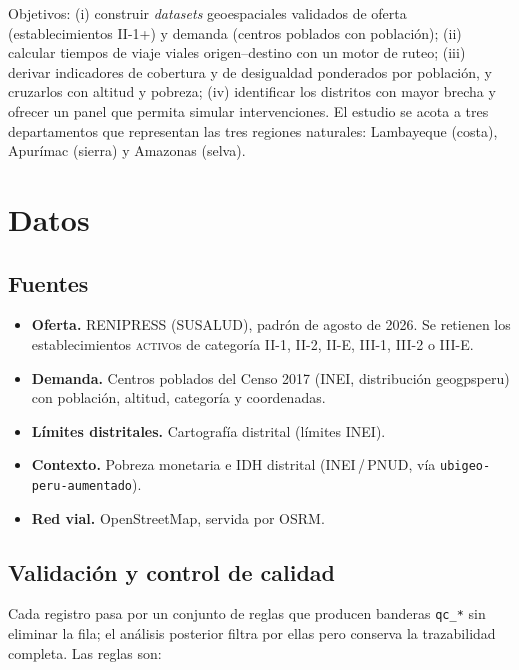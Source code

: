 \documentclass[11pt,a4paper]{article}
\begin{document}
Objetivos: (i) construir \emph{datasets} geoespaciales validados de oferta
(establecimientos II-1+) y demanda (centros poblados con poblaci\'on); (ii)
calcular tiempos de viaje viales origen--destino con un motor de ruteo; (iii)
derivar indicadores de cobertura y de desigualdad ponderados por poblaci\'on, y
cruzarlos con altitud y pobreza; (iv) identificar los distritos con mayor
brecha y ofrecer un panel que permita simular intervenciones. El estudio se
acota a tres departamentos que representan las tres regiones naturales:
Lambayeque (costa), Apur\'imac (sierra) y Amazonas (selva).

\section{Datos}

\subsection{Fuentes}
\begin{itemize}
  \item \textbf{Oferta.} RENIPRESS (SUSALUD), padr\'on de agosto de 2026.
        Se retienen los establecimientos \textsc{activo}s de categor\'ia
        II-1, II-2, II-E, III-1, III-2 o III-E.
  \item \textbf{Demanda.} Centros poblados del Censo 2017 (INEI, distribuci\'on
        geogpsperu) con poblaci\'on, altitud, categor\'ia y coordenadas.
  \item \textbf{L\'imites distritales.} Cartograf\'ia distrital (l\'imites INEI).
  \item \textbf{Contexto.} Pobreza monetaria e IDH distrital
        (INEI\,/\,PNUD, v\'ia \texttt{ubigeo-peru-aumentado}).
  \item \textbf{Red vial.} OpenStreetMap, servida por OSRM.
\end{itemize}

\subsection{Validaci\'on y control de calidad}
Cada registro pasa por un conjunto de reglas que producen banderas
\texttt{qc\_*} sin eliminar la fila; el an\'alisis posterior filtra por ellas
pero conserva la trazabilidad completa. Las reglas son:
\end{document}
